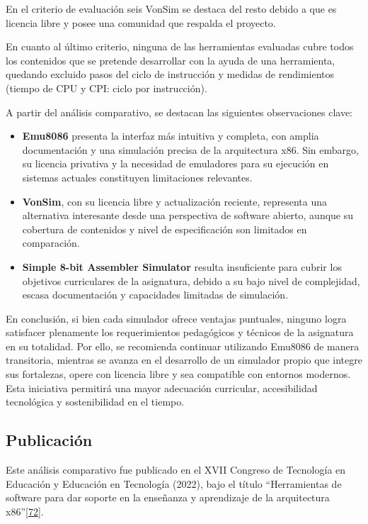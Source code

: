 \documentclass[12pt,oneside]{templates/unerthesis}
\providecommand{\tightlist}{%
  \setlength{\itemsep}{0pt}\setlength{\parskip}{0pt}}
\begin{document}
En el criterio de evaluación seis VonSim se destaca del resto debido a que es licencia libre y posee una comunidad que respalda el proyecto.

En cuanto al último criterio, ninguna de las herramientas evaluadas cubre todos los contenidos que se pretende desarrollar con la ayuda de una herramienta, quedando excluido pasos del ciclo de instrucción y medidas de rendimientos (tiempo de CPU y CPI: ciclo por instrucción).

A partir del análisis comparativo, se destacan las siguientes observaciones clave:

\begin{itemize}
\tightlist
\item
  \textbf{Emu8086} presenta la interfaz más intuitiva y completa, con amplia documentación y una simulación precisa de la arquitectura x86. Sin embargo, su licencia privativa y la necesidad de emuladores para su ejecución en sistemas actuales constituyen limitaciones relevantes.
\item
  \textbf{VonSim}, con su licencia libre y actualización reciente, representa una alternativa interesante desde una perspectiva de software abierto, aunque su cobertura de contenidos y nivel de especificación son limitados en comparación.
\item
  \textbf{Simple 8-bit Assembler Simulator} resulta insuficiente para cubrir los objetivos curriculares de la asignatura, debido a su bajo nivel de complejidad, escasa documentación y capacidades limitadas de simulación.
\end{itemize}

En conclusión, si bien cada simulador ofrece ventajas puntuales, ninguno logra satisfacer plenamente los requerimientos pedagógicos y técnicos de la asignatura en su totalidad. Por ello, se recomienda continuar utilizando Emu8086 de manera transitoria, mientras se avanza en el desarrollo de un simulador propio que integre sus fortalezas, opere con licencia libre y sea compatible con entornos modernos. Esta iniciativa permitirá una mayor adecuación curricular, accesibilidad tecnológica y sostenibilidad en el tiempo.

\hypertarget{publicaciuxf3n}{%
\subsection{Publicación}\label{publicaciuxf3n}}

Este análisis comparativo fue publicado en el XVII Congreso de Tecnología en Educación y Educación en Tecnología (2022), bajo el título ``Herramientas de software para dar soporte en la enseñanza y aprendizaje de la arquitectura x86''\protect\hyperlink{ref-colombani_herramientas_2022}{{[}72{]}}.
\end{document}

